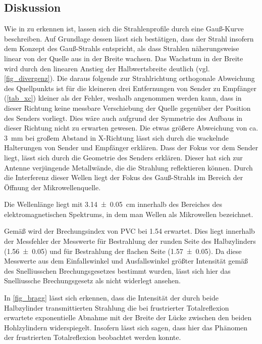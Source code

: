 \documentclass[
	a4paper,
	12pt,
	pagesize,
	ngerman
]{scrartcl}
\begin{document}
	\subsection{Diskussion}
	
	Wie in  zu erkennen ist, lassen sich die Strahlenprofile durch eine Gauß-Kurve beschreiben.
	Auf Grundlage dessen lässt sich bestätigen, dass der Strahl insofern dem Konzept des Gauß-Strahls entspricht, als dass Strahlen näherungsweise linear von der Quelle aus in der Breite wachsen.
	Das Wachstum in der Breite wird durch den linearen Anstieg der Halbwertsbreite deutlich (vgl. \cref{fig_divergenz}).
	Die daraus folgende zur Strahlrichtung orthogonale Abweichung des Quellpunkts ist für die kleineren drei Entfernungen von Sender zu Empfänger (\cref{tab_xc}) kleiner als der Fehler, weshalb angenommen werden kann, dass in dieser Richtung keine messbare Verschiebung der Quelle gegenüber der Position des Senders vorliegt.
	Dies wäre auch aufgrund der Symmetrie des Aufbaus in dieser Richtung nicht zu erwarten gewesen.
	Die etwas größere Abweichung von ca. \SI{3}{mm} bei großem Abstand in X-Richtung lässt sich durch die wackelnde Halterungen von Sender und Empfänger erklären.
	Dass der Fokus vor dem Sender liegt, lässt sich durch die Geometrie des Senders erklären.
	Dieser hat sich zur Antenne verjüngende Metallwände, die die Strahlung reflektieren können.
	Durch die Interferenz dieser Wellen liegt der Fokus des Gauß-Strahls im Bereich der Öffnung der Mikrowellenquelle.
	
	Die Wellenlänge liegt mit \SI{3,14\pm 0,05}{cm} innerhalb des Bereiches des elektromagnetischen Spektrums, in dem man Wellen als Mikrowellen bezeichnet.
	
	Gemäß \cite{PVC-Brech} wird der Brechungsindex von PVC bei \SI{1,54}{} erwartet.
	Dies liegt innerhalb der Messfehler der Messwerte für Bestrahlung der runden Seite des Halbzylinders (\SI{1,56\pm 0,05}{}) und für Bestrahlung der flachen Seite (\SI{1,57 \pm 0,05}{}).
	Da diese Messwerte aus dem Einfallswinkel und Ausfallswinkel größter Intensität gemäß des Snelliusschen Brechungsgesetzes bestimmt wurden, lässt sich hier das Snelliussche Brechungsgesetz als nicht widerlegt ansehen.
	
	In \cref{fig_bragg} lässt sich erkennen, dass die Intensität der durch beide Halbzylinder transmittierten Strahlung die bei frustrierter Totalreflexion erwartete exponentielle Abnahme mit der Breite der Lücke zwischen den beiden Hohlzylindern widerspiegelt.
	Insofern lässt sich sagen, dass hier das Phänomen der frustrierten Totalreflexion beobachtet werden konnte.
	
\end{document}
